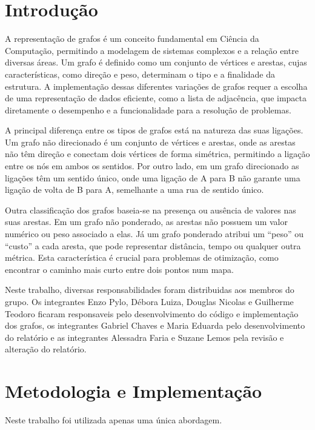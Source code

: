 \documentclass[12pt]{article}
\begin{document}
\section{Introdução}
A representação de grafos é um conceito fundamental em Ciência da Computação, 
permitindo a modelagem de sistemas complexos e a relação entre diversas áreas. Um grafo é 
definido como um conjunto de vértices e arestas, cujas características, como direção e peso, 
determinam o tipo e a finalidade da estrutura. A implementação dessas diferentes variações de 
grafos requer a escolha de uma representação de dados eficiente, como a lista de adjacência, que 
impacta diretamente o desempenho e a funcionalidade para a resolução de problemas.  

A principal diferença entre os tipos de grafos está na natureza das suas ligações. Um grafo 
não direcionado é um conjunto de vértices e arestas, onde as arestas não têm direção e conectam 
dois vértices de forma simétrica, permitindo a ligação entre os nós em ambos os sentidos. Por 
outro lado, em um grafo direcionado as ligações têm um sentido único, onde uma ligação de A 
para B não garante uma ligação de volta de B para A, semelhante a uma rua de sentido único. 

Outra classificação dos grafos baseia-se na presença ou ausência de valores nas suas 
arestas. Em um grafo não ponderado, as arestas não possuem um valor numérico ou peso associado 
a elas. Já um grafo ponderado atribui um ``peso'' ou ``custo'' a cada aresta, que pode representar 
distância, tempo ou qualquer outra métrica. Esta característica é crucial para problemas de 
otimização, como encontrar o caminho mais curto entre dois pontos num mapa. 

Neste trabalho, diversas responsabilidades foram distribuidas aos membros do grupo. Os integrantes Enzo Pylo, Débora Luiza, Douglas Nicolas e Guilherme Teodoro ficaram responsaveis pelo desenvolvimento do código e implementação dos grafos, os integrantes Gabriel Chaves e Maria Eduarda pelo desenvolvimento do relatório e as integrantes Alessadra Faria e Suzane Lemos pela revisão e alteração do relatório.

\section{Metodologia e Implementação}

Neste trabalho foi utilizada apenas uma única abordagem.
\end{document}
